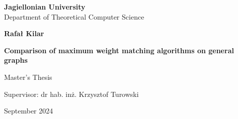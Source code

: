 \begin{titlepage}
\begin{center}        
	\large
	\textbf{Jagiellonian University}\\
	Department of Theoretical Computer Science\\

	\vspace{1.5cm}

	\Large
	\textbf{Rafał Kilar}

	\vspace*{2cm}

	\textbf{\LARGE Comparison of maximum weight matching algorithms on general graphs}
	
	\vspace{0.5cm}
	\large
	
	\vfill
	\Large
	Master's Thesis

	\vfill
	\Large
	Supervisor: dr hab. in\.z. Krzysztof Turowski
	
	\vspace{0.8cm}
	
	September 2024
\end{center}
\end{titlepage}